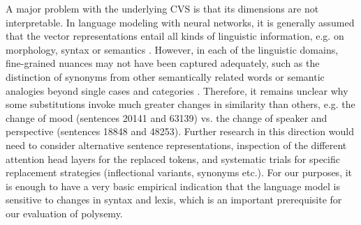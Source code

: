 \documentclass[runningheads]{llncs}
\begin{document}
A major problem with the underlying \gls{CVS} is that its dimensions are not interpretable. In language modeling with neural networks, it is generally assumed that the vector representations entail all kinds of linguistic information, e.g. on morphology, syntax or semantics \parencites[8]{gladkovaAnalogybasedDetectionMorphological2016}[143]{rogersTooManyProblems2017}. However, in each of the linguistic domains, fine-grained nuances may not have been captured adequately, such as the distinction of synonyms from other semantically related words \parencite[115]{karanDistributionalSemanticsApproach2012} or semantic analogies beyond single cases and categories \parencite[142f.]{rogersTooManyProblems2017}. Therefore, it remains unclear why some substitutions invoke much greater changes in similarity than others, e.g. the change of mood (sentences 20141 and 63139) vs. the change of speaker and perspective (sentences 18848 and 48253). Further research in this direction would need to consider alternative sentence representations, inspection of the different attention head layers for the replaced tokens, and systematic trials for specific replacement strategies (inflectional variants, synonyms etc.). For our purposes, it is enough to have a very basic empirical indication that the language model is sensitive to changes in syntax and lexis, which is an important prerequisite for our evaluation of polysemy. 
\end{document}
